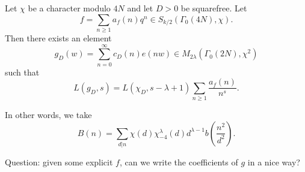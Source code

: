\documentclass[reqno]{amsart} 
\begin{document}
\begin{theorem}[Shimura, 1973]
  Let $\chi$ be a character modulo $4 N$ and let $D > 0$ be squarefree.  Let
  \begin{equation*}
    f = \sum_{n \geq 1} a_f (n) q^n \in S_{k / 2} (\Gamma_0 (4 N), \chi ).
  \end{equation*}
  Then there exists an element
  \begin{equation*}
    g_D (w) = \sum_{n = 0}^\infty c_D (n) e (n w)
    \in M_{2 \lambda } (\Gamma_0 (2 N), \chi^2 )
  \end{equation*}
  such that
  \begin{equation*}
    L (g_D, s)
    =
    L (\chi_D , s - \lambda + 1)
    \sum_{n \geq 1}
    \frac{a_f (n)}{ n^s}.
  \end{equation*}
\end{theorem}
In other words, we take
\begin{equation*}
  B (n) = \sum_{d | n} \chi (d) \chi_{- 4 }^\lambda (d) d^{\lambda - 1} b \left( \frac{n^2 }{d^2 } \right).
\end{equation*}

Question: given some explicit $f$, can we write the coefficients of $g$ in a nice way?
\end{document}
